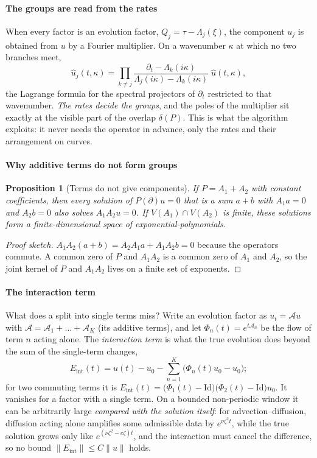 \documentclass[11pt]{article}
\theoremstyle{plain}
\newtheorem{proposition}[theorem]{Proposition}
\theoremstyle{definition}
\theoremstyle{remark}
\newcommand{\Var}{V}                        %
\newcommand{\Id}{\mathrm{Id}}
\newcommand{\Eint}{E_{\mathrm{int}}}        %
\newcommand{\flow}{\Phi}                    %
\newcommand{\deltaP}{\delta(P)}             %
\newcommand{\norm}[1]{\lVert#1\rVert}
\begin{document}
\paragraph{The groups are read from the rates} When every factor is an evolution factor, $Q_j=\tau-\Lambda_j(\xi)$, the
component $u_j$ is obtained from $u$ by a Fourier multiplier. On a wavenumber $\kappa$ at which no two branches meet,
\begin{equation}\label{eq:lagrange}
  \hat u_j(t,\kappa)=\prod_{k\neq j}\frac{\partial_t-\Lambda_k(i\kappa)}{\Lambda_j(i\kappa)-\Lambda_k(i\kappa)}\;\hat u(t,\kappa),
\end{equation}
the Lagrange formula for the spectral projectors of $\partial_t$ restricted to that wavenumber. \emph{The rates decide
the groups}, and the poles of the multiplier sit exactly at the visible part of the overlap $\deltaP$. This is what the
algorithm exploits: it never needs the operator in advance, only the rates and their arrangement on curves.

\paragraph{Why additive terms do not form groups}
\begin{proposition}[Terms do not give components]\label{prop:terms}
If $P=A_1+A_2$ with constant coefficients, then every solution of $P(\partial)u=0$ that is a sum $a+b$ with $A_1a=0$
and $A_2b=0$ also solves $A_1A_2u=0$. If $\Var(A_1)\cap\Var(A_2)$ is finite, these solutions form a finite-dimensional
space of exponential-polynomials.
\end{proposition}
\begin{proof}[Proof sketch]
$A_1A_2(a+b)=A_2A_1a+A_1A_2b=0$ because the operators commute. A common zero of $P$ and $A_1A_2$ is a common zero of $A_1$
and $A_2$, so the joint kernel of $P$ and $A_1A_2$ lives on a finite set of exponents.
\end{proof}

\paragraph{The interaction term} What does a split into single terms miss? Write an evolution factor as
$u_t=\mathcal Au$ with $\mathcal A=\mathcal A_1+\dots+\mathcal A_K$ (its additive terms), and let $\flow_n(t)=e^{t\mathcal A_n}$
be the flow of term $n$ acting alone. The \emph{interaction term} is what the true evolution does beyond the sum of the
single-term changes,
\begin{equation}\label{eq:eint}
  \Eint(t)=u(t)-u_0-\sum_{n=1}^K\big(\flow_n(t)u_0-u_0\big);
\end{equation}
for two commuting terms it is $\Eint(t)=\big(\flow_1(t)-\Id\big)\big(\flow_2(t)-\Id\big)u_0$. It vanishes for a factor with
a single term. On a bounded non-periodic window it can be arbitrarily large \emph{compared with the solution itself}: for
advection--diffusion, diffusion acting alone amplifies some admissible data by $e^{\nu\zeta^2t}$, while the true solution
grows only like $e^{(\nu\zeta^2-c\zeta)t}$, and the interaction must cancel the difference, so no bound
$\norm{\Eint}\le C\norm{u}$ holds.
\end{document}
